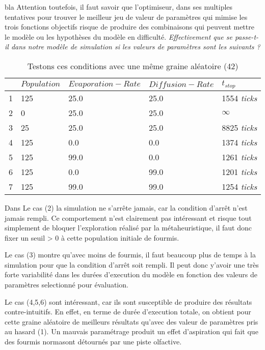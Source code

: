 \begin{framewithtitle}[bla]{bla}
Attention toutefois, il faut savoir que l'optimiseur, dans ses multiples tentatives pour trouver le meilleur jeu de valeur de paramètres qui mimise les trois fonctions objectifs risque de produire des combinaisons qui peuvent mettre le modèle ou les hypothèses du modèle en difficulté. \textit{Effectivement que se passe-t-il dans notre modèle de simulation si les valeurs de paramètres sont les suivants ? }

\begin{table}[H]
\centering
\caption{Testons ces conditions avec une même graine aléatoire (42)}
\label{tab:experience}
\begin{tabular}{lllll}
\hline
  & $Population$ & $Evaporation-Rate$ & $Diffusion-Rate$ & $t_{stop}$ \\ \hline
1 & 125        & 25.0             & 25.0  & 1554 \textit{ticks} \\
2 & 0          & 25.0             & 25.0  & $\infty$ \\
3 & 25         & 25.0             & 25.0  & 8825 \textit{ticks} \\
4 & 125        & 0.0              & 0.0   & 1374 \textit{ticks} \\
5 & 125        & 99.0             & 0.0   & 1261 \textit{ticks} \\
6 & 125        & 0.0              & 99.0  & 1201 \textit{ticks} \\ 
7 & 125        & 99.0             & 99.0  & 1254 \textit{ticks} \\ \hline
\end{tabular}
\end{table}

Dans Le cas (2) la simulation ne s'arrête jamais, car la condition d'arrêt n'est jamais rempli. Ce comportement n'est clairement pas intéressant et risque tout simplement de bloquer l'exploration réalisé par la métaheuristique, il faut donc fixer un seuil > 0 à cette population initiale de fourmis.

Le cas (3) montre qu'avec moins de fourmis, il faut beaucoup plus de temps à la simulation pour que la condition d'arrêt soit rempli. Il peut donc y'avoir une très forte variabilité dans les durées d'execution du modèle en fonction des valeurs de paramètres selectionné pour évaluation.

Le cas (4,5,6) sont intéressant, car ils sont susceptible de produire des résultats contre-intuitifs. En effet, en terme de durée d'execution totale, on obtient pour cette graine aléatoire de meilleurs résultats qu'avec des valeur de paramètres pris au hasard (1). Un mauvais paramétrage produit un effet d'aspiration qui fait que des fourmis normasont détournés par une piste olfactive.


\end{framewithtitle}
